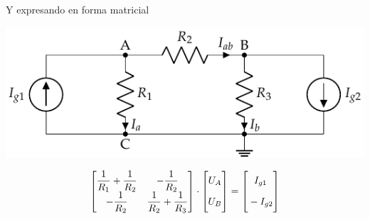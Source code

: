 \documentclass[aspectratio=169, xcolor={usenames,svgnames,dvipsnames}]{beamer}
\begin{document}
\begin{frame}{Y expresando en forma matricial}
    \begin{center}
    \includegraphics[width=.7\linewidth]{../figs/nudos.pdf}
    \end{center}
    \begin{equation*}
      \begin{bmatrix}
        \dfrac{1}{R_1}+\dfrac{1}{R_2} & - \dfrac{1}{R_2}\\
        -\dfrac{1}{R_2} & \dfrac{1}{R_2}+\dfrac{1}{R_3}
      \end{bmatrix} \cdot%
      \begin{bmatrix}
        \vphantom{\dfrac{1}{R_1}} U_A\\
        \vphantom{\dfrac{1}{R_1}} U_B
      \end{bmatrix} = %
      \begin{bmatrix}
        \vphantom{\dfrac{1}{R_1}} I_{g1}\\
        \vphantom{\dfrac{1}{R_1}} -I_{g2}
      \end{bmatrix}
    \end{equation*}
\end{frame}

\end{document}

